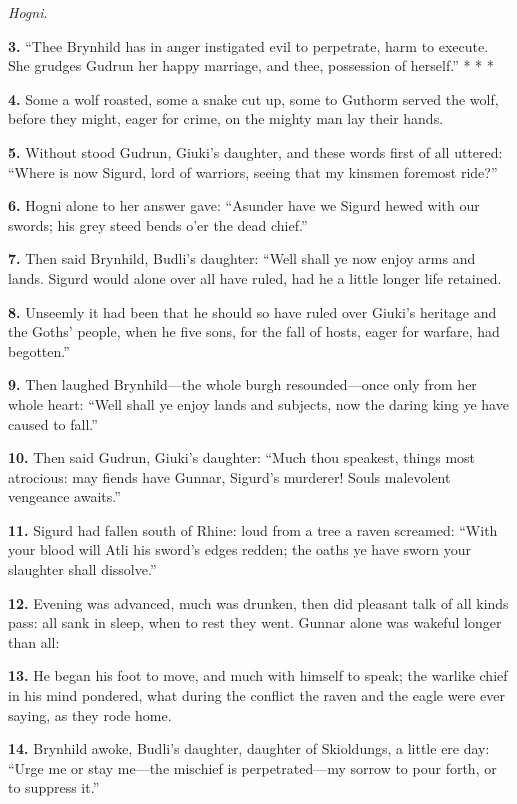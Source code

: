 \emph{Hogni}.

\textbf{3.} ``Thee Brynhild has in anger instigated evil to perpetrate, harm
to execute. She grudges Gudrun her happy marriage, and thee,
possession of herself.'' * * *

\textbf{4.} Some a wolf roasted, some a snake cut up, some to Guthorm served
the wolf, before they might, eager for crime, on the mighty man lay
their hands.

\textbf{5.} Without stood Gudrun, Giuki's daughter, and these words first of
all uttered: ``Where is now Sigurd, lord of warriors, seeing that my
kinsmen foremost ride?''

\textbf{6.} Hogni alone to her answer gave: ``Asunder have we Sigurd hewed
with our swords; his grey steed bends o'er the dead chief.''

\textbf{7.} Then said Brynhild, Budli's daughter: ``Well shall ye now enjoy
arms and lands. Sigurd would alone over all have ruled, had he a
little longer life retained.

\textbf{8.} Unseemly it had been that he should so have ruled over Giuki's
heritage and the Goths' people, when he five sons, for the fall of
hosts, eager for warfare, had begotten.''

\textbf{9.} Then laughed Brynhild—the whole burgh resounded—once only from
her whole heart: ``Well shall ye enjoy lands and subjects, now the
daring king ye have caused to fall.''

\textbf{10.} Then said Gudrun, Giuki's daughter: ``Much thou speakest, things
most atrocious: may fiends have Gunnar, Sigurd's murderer! Souls
malevolent vengeance awaits.''

\textbf{11.} Sigurd had fallen south of Rhine: loud from a tree a raven
screamed: ``With your blood will Atli his sword's edges redden; the
oaths ye have sworn your slaughter shall dissolve.''

\textbf{12.} Evening was advanced, much was drunken, then did pleasant talk
of all kinds pass: all sank in sleep, when to rest they went. Gunnar
alone was wakeful longer than all:

\textbf{13.} He began his foot to move, and much with himself to speak; the
warlike chief in his mind pondered, what during the conflict the raven
and the eagle were ever saying, as they rode home.

\textbf{14.} Brynhild awoke, Budli's daughter, daughter of Skioldungs, a
little ere day: ``Urge me or stay me—the mischief is perpetrated—my
sorrow to pour forth, or to suppress it.''


